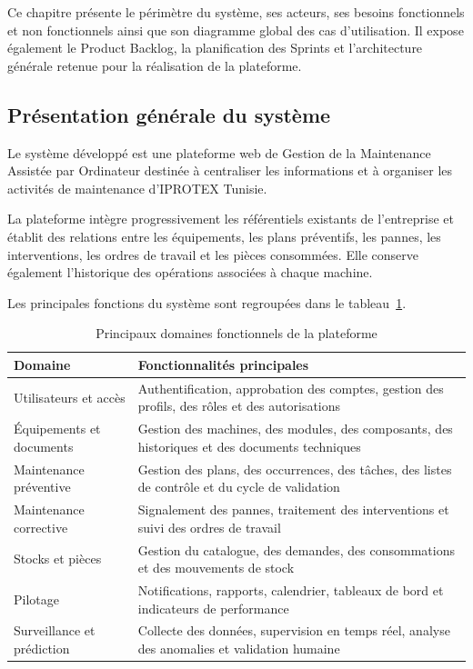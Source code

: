 Ce chapitre présente le périmètre du système, ses acteurs, ses besoins fonctionnels et non fonctionnels ainsi que son diagramme global des cas d’utilisation. Il expose également le Product Backlog, la planification des Sprints et l’architecture générale retenue pour la réalisation de la plateforme.

\subsection{Présentation générale du système}

Le système développé est une plateforme web de Gestion de la Maintenance Assistée par Ordinateur destinée à centraliser les informations et à organiser les activités de maintenance d’IPROTEX Tunisie.

La plateforme intègre progressivement les référentiels existants de l’entreprise et établit des relations entre les équipements, les plans préventifs, les pannes, les interventions, les ordres de travail et les pièces consommées. Elle conserve également l’historique des opérations associées à chaque machine.

Les principales fonctions du système sont regroupées dans le tableau~\ref{tab:domaines-fonctionnels}.

\begin{table}[H]
\centering
\caption{Principaux domaines fonctionnels de la plateforme}
\label{tab:domaines-fonctionnels}
\small
\begin{tabularx}{\textwidth}{|p{3.8cm}|X|}
\hline
\textbf{Domaine} & \textbf{Fonctionnalités principales} \\
\hline

Utilisateurs et accès &
Authentification, approbation des comptes, gestion des profils, des rôles et des autorisations \\
\hline

Équipements et documents &
Gestion des machines, des modules, des composants, des historiques et des documents techniques \\
\hline

Maintenance préventive &
Gestion des plans, des occurrences, des tâches, des listes de contrôle et du cycle de validation \\
\hline

Maintenance corrective &
Signalement des pannes, traitement des interventions et suivi des ordres de travail \\
\hline

Stocks et pièces &
Gestion du catalogue, des demandes, des consommations et des mouvements de stock \\
\hline

Pilotage &
Notifications, rapports, calendrier, tableaux de bord et indicateurs de performance \\
\hline

Surveillance et prédiction &
Collecte des données, supervision en temps réel, analyse des anomalies et validation humaine \\
\hline
\end{tabularx}
\end{table}

